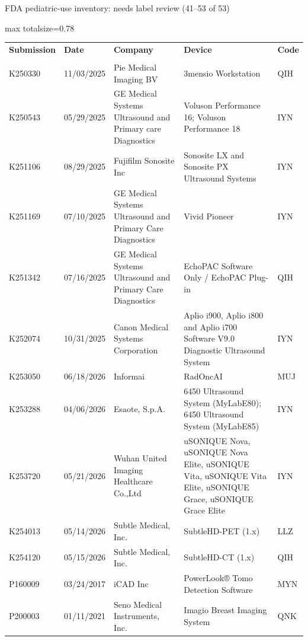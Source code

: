 \documentclass[aspectratio=169]{beamer}
\renewcommand{\arraystretch}{1.08}
\begin{document}
\begin{frame}[category=FDA appendix]{FDA pediatric-use inventory: needs label review (41--53 of 53)}
\begin{adjustbox}{max totalsize={\textwidth}{0.78\textheight}}
\renewcommand{\arraystretch}{1.2}
\begin{tabular}{|p{}|p{}|p{}|p{}|p{}|}
\hline \textbf{Submission} & \textbf{Date} & \textbf{Company} & \textbf{Device} & \textbf{Code} \\\\ \hline
K250330 & 11/03/2025 & Pie Medical Imaging BV & 3mensio Workstation & QIH \\ \hline
K250543 & 05/29/2025 & GE Medical Systems Ultrasound and Primary care Diagnostics & Voluson Performance 16; Voluson Performance 18 & IYN \\ \hline
K251106 & 08/29/2025 & Fujifilm Sonosite Inc & Sonosite LX and Sonosite PX Ultrasound Systems & IYN \\ \hline
K251169 & 07/10/2025 & GE Medical Systems Ultrasound and Primary Care Diagnostics & Vivid Pioneer & IYN \\ \hline
K251342 & 07/16/2025 & GE Medical Systems Ultrasound and Primary Care Diagnostics & EchoPAC Software Only / EchoPAC Plug-in & QIH \\ \hline
K252074 & 10/31/2025 & Canon Medical Systems Corporation & Aplio i900, Aplio i800 and Aplio i700 Software V9.0 Diagnostic Ultrasound System & IYN \\ \hline
K253050 & 06/18/2026 & Informai & RadOncAI & MUJ \\ \hline
K253288 & 04/06/2026 & Esaote, S.p.A. & 6450 Ultrasound System (MyLabE80); 6450 Ultrasound System (MyLabE85) & IYN \\ \hline
K253720 & 05/21/2026 & Wuhan United Imaging Healthcare Co.,Ltd & uSONIQUE Nova, uSONIQUE Nova Elite, uSONIQUE Vita, uSONIQUE Vita Elite, uSONIQUE Grace, uSONIQUE Grace Elite & IYN \\ \hline
K254013 & 05/14/2026 & Subtle Medical, Inc. & SubtleHD-PET (1.x) & LLZ \\ \hline
K254120 & 05/15/2026 & Subtle Medical, Inc. & SubtleHD-CT (1.x) & QIH \\ \hline
P160009 & 03/24/2017 & iCAD Inc & PowerLook® Tomo Detection Software & MYN \\ \hline
P200003 & 01/11/2021 & Seno Medical Instruments, Inc. & Imagio Breast Imaging System & QNK \\ \hline
\end{tabular}
\end{adjustbox}
\end{frame}
\end{document}
